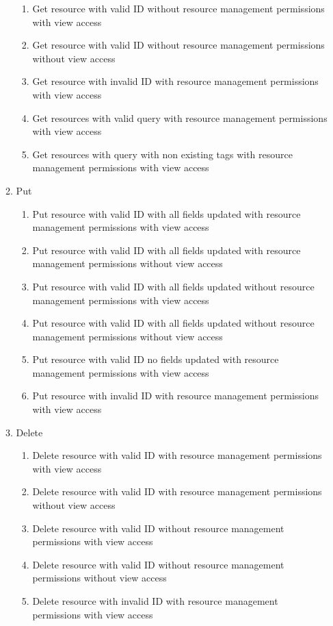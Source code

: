 \documentclass[12pt]{article}
\begin{document}
\begin{enumerate}
\begin{enumerate}
\begin{enumerate}
            \item Get resource with valid ID without resource management permissions with view access
            \item Get resource with valid ID without resource management permissions without view access
            \item Get resource with invalid ID with resource management permissions with view access
            \item Get resources with valid query with resource management permissions with view access
            \item Get resources with query with non existing tags with resource management permissions with view access    
        \end{enumerate}
        \item Put
        \begin{enumerate}
            \item Put resource with valid ID with all fields updated with resource management permissions with view access
            \item Put resource with valid ID with all fields updated with resource management permissions without view access
            \item Put resource with valid ID with all fields updated without resource management permissions with view access
            \item Put resource with valid ID with all fields updated without resource management permissions without view access
            \item Put resource with valid ID no fields updated with resource management permissions with view access
            \item Put resource with invalid ID with resource management permissions with view access
        \end{enumerate}
        \item Delete
        \begin{enumerate}
            \item Delete resource with valid ID with resource management permissions with view access
            \item Delete resource with valid ID with resource management permissions without view access
            \item Delete resource with valid ID without resource management permissions with view access
            \item Delete resource with valid ID without resource management permissions without view access
            \item Delete resource with invalid ID with resource management permissions with view access
        \end{enumerate}
        

\end{enumerate}
\end{enumerate}
\end{document}
